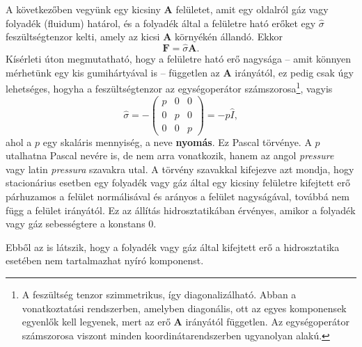 \documentclass[12pt,a4paper]{scrartcl}
\let\mathbf\bm
\begin{document}
A következőben vegyünk egy kicsiny ${\mathbf{A}}$ felületet, amit egy oldalról gáz vagy folyadék (fluidum) határol, és a folyadék által a felületre ható erőket egy $\hat \sigma$ feszültségtenzor kelti, amely az kicsi ${\mathbf{A}}$ környékén állandó. Ekkor 
\[{\mathbf{F}} = \hat \sigma {\mathbf{A}}.\]
Kísérleti úton megmutatható, hogy a felületre ható erő nagysága -- amit könnyen mérhetünk egy kis gumihártyával is -- független az ${\mathbf{A}}$ irányától, ez pedig csak úgy lehetséges, hogyha a feszültségtenzor az egységoperátor számszorosa\footnote{A feszültség tenzor szimmetrikus, így diagonalizálható. Abban a vonatkoztatási rendszerben, amelyben diagonális, ott az egyes komponensek egyenlők kell legyenek, mert az erő ${\mathbf{A}}$ irányától független. Az egységoperátor számszorosa viszont minden koordinátarendszerben ugyanolyan alakú.}, vagyis
\begin{equation} \label{eq:pascal}
\hat \sigma  =  - \left( {\begin{array}{*{20}{c}}
  p&0&0 \\ 
  0&p&0 \\ 
  0&0&p 
\end{array}} \right) =  - p\hat I,
\end{equation}
ahol a $p$ egy skaláris mennyiség, a neve \textbf{nyomás}. Ez Pascal törvénye. A $p$ utalhatna Pascal nevére is, de nem arra vonatkozik, hanem az angol \textit{pressure} vagy latin \textit{pressura} szavakra utal. A törvény szavakkal kifejezve azt mondja, hogy stacionárius esetben egy folyadék vagy gáz által egy kicsiny felületre kifejtett erő párhuzamos a felület normálisával és arányos a felület nagyságával, továbbá nem függ a felület irányától. Ez az állítás hidrosztatikában érvényes, amikor a folyadék vagy gáz sebességtere a konstans 0.

Ebből az is látszik, hogy a folyadék vagy gáz által kifejtett erő a hidrosztatika esetében nem tartalmazhat nyíró komponenst.

\footnotesize
\end{document}
